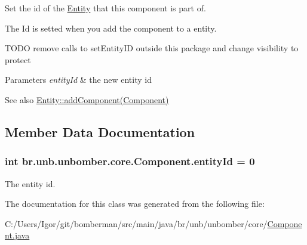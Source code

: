 Set the id of the \hyperlink{classbr_1_1unb_1_1unbomber_1_1core_1_1_entity}{Entity} that this component is part of. 

The Id is setted when you add the component to a entity.

T\+O\+D\+O remove calls to set\+Entity\+I\+D outside this package and change visibility to protect


\begin{DoxyParams}{Parameters}
{\em entity\+Id} & the new entity id \\
\hline
\end{DoxyParams}
\begin{DoxySeeAlso}{See also}
\hyperlink{classbr_1_1unb_1_1unbomber_1_1core_1_1_entity_a4dcc0f5903b3ac4af4600fee95bb2328}{Entity\+::add\+Component(\+Component)} 
\end{DoxySeeAlso}


\subsection{Member Data Documentation}
\hypertarget{classbr_1_1unb_1_1unbomber_1_1core_1_1_component_a3eff11219571ba1890651e922b9879ef}{
\subsubsection[{entity\+Id}]{\setlength{\rightskip}{0pt plus 5cm}int br.\+unb.\+unbomber.\+core.\+Component.\+entity\+Id = 0\hspace{0.3cm}{\ttfamily [private]}}}\label{classbr_1_1unb_1_1unbomber_1_1core_1_1_component_a3eff11219571ba1890651e922b9879ef}


The entity id. 



The documentation for this class was generated from the following file\+:\begin{DoxyCompactItemize}
\item 
C\+:/\+Users/\+Igor/git/bomberman/src/main/java/br/unb/unbomber/core/\hyperlink{_component_8java}{Component.\+java}\end{DoxyCompactItemize}
